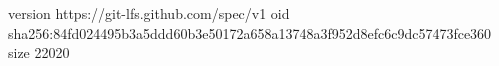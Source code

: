 version https://git-lfs.github.com/spec/v1
oid sha256:84fd024495b3a5ddd60b3e50172a658a13748a3f952d8efc6c9dc57473fce360
size 22020
